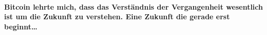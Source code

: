 \paragraph{Bitcoin lehrte mich, dass das Verständnis der Vergangenheit
wesentlich ist um die Zukunft zu verstehen. Eine Zukunft die gerade erst
beginnt\ldots}

%
%
%
%
%
